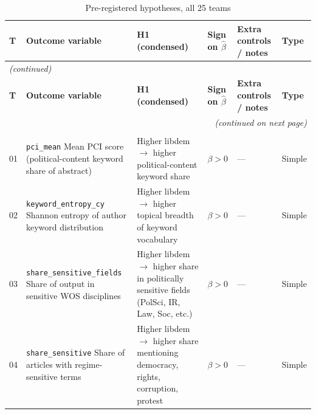 \documentclass[12pt,a4paper]{article}
\begin{document}
\begin{landscape}
\small
\begin{longtable}{
  @{}
  p{0.6cm}   %
  p{3.6cm}   %
  p{6.0cm}   %
  p{1.4cm}   %
  p{4.0cm}   %
  p{1.2cm}   %
  @{}
}
\caption{Pre-registered hypotheses, all 25 teams}
\label{tab:hypotheses} \\
\toprule
\textbf{T} & \textbf{Outcome variable} & \textbf{H1 (condensed)} &
\textbf{Sign on $\hat{\beta}$} & \textbf{Extra controls / notes} & \textbf{Type} \\
\midrule
\endfirsthead
\multicolumn{6}{l}{\footnotesize\textit{(continued)}} \\
\toprule
\textbf{T} & \textbf{Outcome variable} & \textbf{H1 (condensed)} &
\textbf{Sign on $\hat{\beta}$} & \textbf{Extra controls / notes} & \textbf{Type} \\
\midrule
\endhead
\midrule
\multicolumn{6}{r}{\footnotesize\textit{(continued on next page)}} \\
\endfoot
\bottomrule
\endlastfoot

\multicolumn{6}{l}{\textbf{Sub-family: topic-avoidance} \quad $k=7$, $\alpha^* = 0.0071$} \\[2pt]
01 & \texttt{pci\_mean} \newline \footnotesize{Mean PCI score (political-content keyword share of abstract)}
   & Higher libdem $\to$ higher political-content keyword share
   & $\beta > 0$ & --- & Simple \\[4pt]

02 & \texttt{keyword\_entropy\_cy} \newline \footnotesize{Shannon entropy of author keyword distribution}
   & Higher libdem $\to$ higher topical breadth of keyword vocabulary
   & $\beta > 0$ & --- & Simple \\[4pt]

03 & \texttt{share\_sensitive\_fields} \newline \footnotesize{Share of output in sensitive WOS disciplines}
   & Higher libdem $\to$ higher share in politically sensitive fields (PolSci, IR, Law, Soc, etc.)
   & $\beta > 0$ & --- & Simple \\[4pt]

04 & \texttt{share\_sensitive} \newline \footnotesize{Share of articles with regime-sensitive terms}
   & Higher libdem $\to$ higher share mentioning democracy, rights, corruption, protest
   & $\beta > 0$ & --- & Simple \\[4pt]


\end{longtable}
\end{landscape}
\end{document}
